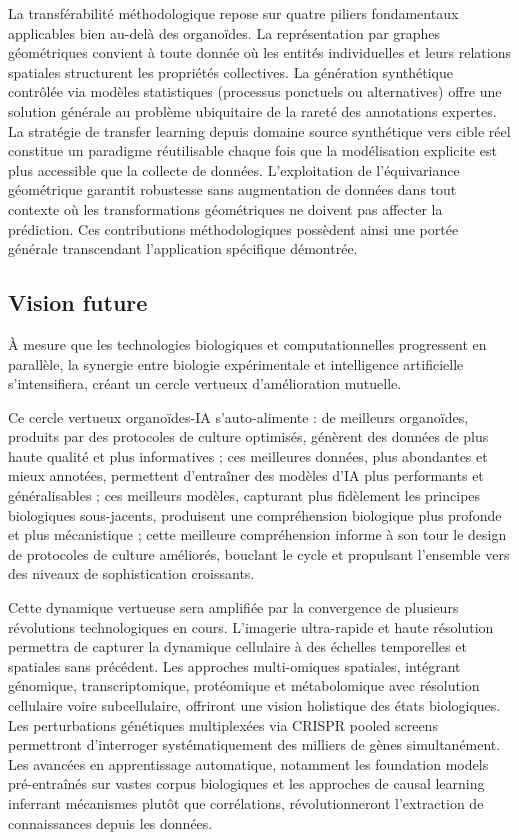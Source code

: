 La transférabilité méthodologique repose sur quatre piliers fondamentaux applicables bien au-delà des organoïdes. La représentation par graphes géométriques convient à toute donnée où les entités individuelles et leurs relations spatiales structurent les propriétés collectives. La génération synthétique contrôlée via modèles statistiques (processus ponctuels ou alternatives) offre une solution générale au problème ubiquitaire de la rareté des annotations expertes. La stratégie de transfer learning depuis domaine source synthétique vers cible réel constitue un paradigme réutilisable chaque fois que la modélisation explicite est plus accessible que la collecte de données. L'exploitation de l'équivariance géométrique garantit robustesse sans augmentation de données dans tout contexte où les transformations géométriques ne doivent pas affecter la prédiction. Ces contributions méthodologiques possèdent ainsi une portée générale transcendant l'application spécifique démontrée.

\subsection{Vision future}

À mesure que les technologies biologiques et computationnelles progressent en parallèle, la synergie entre biologie expérimentale et intelligence artificielle s'intensifiera, créant un cercle vertueux d'amélioration mutuelle.

Ce cercle vertueux organoïdes-IA s'auto-alimente : de meilleurs organoïdes, produits par des protocoles de culture optimisés, génèrent des données de plus haute qualité et plus informatives ; ces meilleures données, plus abondantes et mieux annotées, permettent d'entraîner des modèles d'IA plus performants et généralisables ; ces meilleurs modèles, capturant plus fidèlement les principes biologiques sous-jacents, produisent une compréhension biologique plus profonde et plus mécanistique ; cette meilleure compréhension informe à son tour le design de protocoles de culture améliorés, bouclant le cycle et propulsant l'ensemble vers des niveaux de sophistication croissants.

Cette dynamique vertueuse sera amplifiée par la convergence de plusieurs révolutions technologiques en cours. L'imagerie ultra-rapide et haute résolution permettra de capturer la dynamique cellulaire à des échelles temporelles et spatiales sans précédent. Les approches multi-omiques spatiales, intégrant génomique, transcriptomique, protéomique et métabolomique avec résolution cellulaire voire subcellulaire, offriront une vision holistique des états biologiques. Les perturbations génétiques multiplexées via CRISPR pooled screens permettront d'interroger systématiquement des milliers de gènes simultanément. Les avancées en apprentissage automatique, notamment les foundation models pré-entraînés sur vastes corpus biologiques et les approches de causal learning inferrant mécanismes plutôt que corrélations, révolutionneront l'extraction de connaissances depuis les données.

